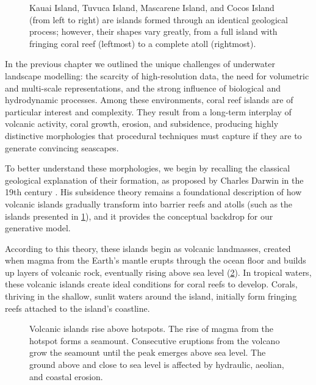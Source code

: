 \begin{figure}[H]
    \caption{Kauai Island, Tuvuca Island, Mascarene Island, and Cocos Island (from left to right) are islands formed through an identical geological process; however, their shapes vary greatly, from a full island with fringing coral reef (leftmost) to a complete atoll (rightmost).}
    \label{fig:coral-island-island-examples}
\end{figure}

In the previous chapter we outlined the unique challenges of underwater landscape modelling: the scarcity of high-resolution data, the need for volumetric and multi-scale representations, and the strong influence of biological and hydrodynamic processes. Among these environments, coral reef islands are of particular interest and complexity. They result from a long-term interplay of volcanic activity, coral growth, erosion, and subsidence, producing highly distinctive morphologies that procedural techniques must capture if they are to generate convincing seascapes.

To better understand these morphologies, we begin by recalling the classical geological explanation of their formation, as proposed by Charles Darwin in the 19th century \cite{Darwin1842}. His subsidence theory remains a foundational description of how volcanic islands gradually transform into barrier reefs and atolls (such as the islands presented in \cref{fig:coral-island-island-examples}), and it provides the conceptual backdrop for our generative model.

According to this theory, these islands begin as volcanic landmasses, created when magma from the Earth's mantle erupts through the ocean floor and builds up layers of volcanic rock, eventually rising above sea level (\cref{fig:coral-island-island-growth}). In tropical waters, these volcanic islands create ideal conditions for coral reefs to develop. Corals, thriving in the shallow, sunlit waters around the island, initially form fringing reefs attached to the island's coastline.

\begin{figure}[H]
    \caption{Volcanic islands rise above hotspots. The rise of magma from the hotspot forms a seamount. Consecutive eruptions from the volcano grow the seamount until the peak emerges above sea level. The ground above and close to sea level is affected by hydraulic, aeolian, and coastal erosion.}
    \label{fig:coral-island-island-growth}
\end{figure}


